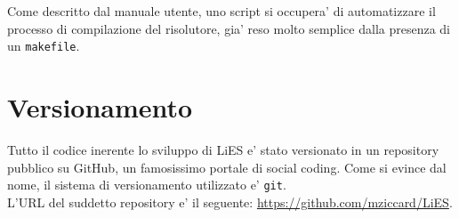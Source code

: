 \documentclass{article}
\begin{document}
Come descritto dal manuale utente, uno script si occupera' di automatizzare il processo di compilazione del risolutore, gia' reso molto semplice dalla presenza di un \verb+makefile+.


\section{Versionamento}
\label{sec:versionamento}

Tutto il codice inerente lo sviluppo di LiES e' stato versionato in un repository pubblico su GitHub, un famosissimo portale di social coding. Come si evince dal nome, il sistema di versionamento utilizzato e' \verb+git+.\\

L'URL del suddetto repository e' il seguente: \url{https://github.com/mziccard/LiES}.

\end{document}
